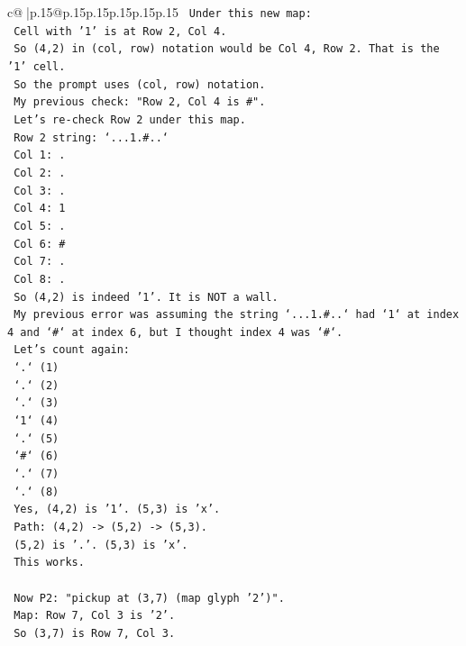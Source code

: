 \documentclass{article}
\begin{document}
{\begin{supertabular}{c@{$\;$}|p{.15\linewidth}@{}p{.15\linewidth}p{.15\linewidth}p{.15\linewidth}p{.15\linewidth}p{.15\linewidth}}
{{{\texttt{   Under this new map:} \\
\texttt{   Cell with '1' is at Row 2, Col 4.} \\
\texttt{   So (4,2) in (col, row) notation would be Col 4, Row 2. That is the '1' cell.} \\
\texttt{   So the prompt uses (col, row) notation.} \\
\texttt{   My previous check: "Row 2, Col 4 is \#".} \\
\texttt{   Let's re{-}check Row 2 under this map.} \\
\texttt{   Row 2 string: `...1.\#..`} \\
\texttt{   Col 1: .} \\
\texttt{   Col 2: .} \\
\texttt{   Col 3: .} \\
\texttt{   Col 4: 1} \\
\texttt{   Col 5: .} \\
\texttt{   Col 6: \#} \\
\texttt{   Col 7: .} \\
\texttt{   Col 8: .} \\
\texttt{   So (4,2) is indeed '1'. It is NOT a wall.} \\
\texttt{   My previous error was assuming the string `...1.\#..` had `1` at index 4 and `\#` at index 6, but I thought index 4 was `\#`.} \\
\texttt{   Let's count again:} \\
\texttt{   `.` (1)} \\
\texttt{   `.` (2)} \\
\texttt{   `.` (3)} \\
\texttt{   `1` (4)} \\
\texttt{   `.` (5)} \\
\texttt{   `\#` (6)} \\
\texttt{   `.` (7)} \\
\texttt{   `.` (8)} \\
\texttt{   Yes, (4,2) is '1'. (5,3) is 'x'.} \\
\texttt{   Path: (4,2) {-}> (5,2) {-}> (5,3).} \\
\texttt{   (5,2) is '.'. (5,3) is 'x'.} \\
\texttt{   This works.} \\
\\ 
\texttt{   Now P2: "pickup at (3,7) (map glyph '2')".} \\
\texttt{   Map: Row 7, Col 3 is '2'.} \\
\texttt{   So (3,7) is Row 7, Col 3.} \\
}}}
\end{supertabular}}
\end{document}
